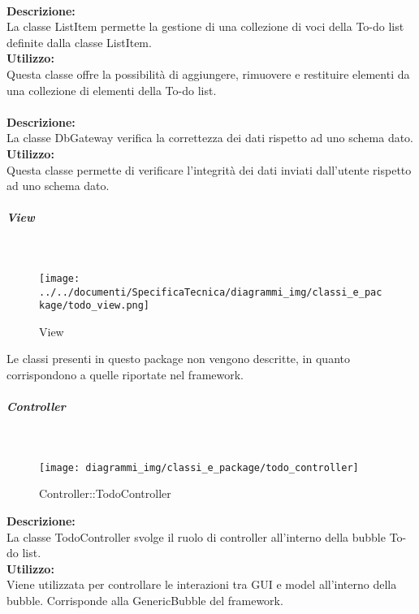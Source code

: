 \label{todo-container}\mbox{}\\
\textbf{Descrizione:}\\ \nopagebreak
La classe List\-Item permette la gestione di una collezione di voci della To-do list definite dalla classe List\-Item.\\
\textbf{Utilizzo:}\\ \nopagebreak
Questa classe offre la possibilità di aggiungere, rimuovere e restituire elementi da una collezione di elementi della To-do list.\\


\label{todo-gateway}\mbox{}\\
\textbf{Descrizione:}\\ \nopagebreak
La classe Db\-Gateway verifica la correttezza dei dati rispetto ad uno schema dato.
\textbf{Utilizzo:}\\ \nopagebreak
Questa classe permette di verificare l'integrità dei dati inviati dall'utente rispetto ad uno schema dato.

\begin{samepage}
	\subparagraph{View}\mbox{}\\
	\nopagebreak
	\begin{figure}[H]
		\centering
		\texttt{[image: ../../documenti/SpecificaTecnica/diagrammi\_img/classi\_e\_package/todo\_view.png]}
		\caption{View}
	\end{figure}
\end{samepage}
Le classi presenti in questo package non vengono descritte, in quanto corrispondono a quelle riportate nel framework.

\subparagraph{Controller}\mbox{}
\begin{samepage}
	\label{todo-controller}\mbox{}\\
	\nopagebreak
	\begin{figure}[H]
		\centering
		\texttt{[image: diagrammi\_img/classi\_e\_package/todo\_controller]}
		\caption{Controller\-::Todo\-Controller}
	\end{figure}
\end{samepage}
\textbf{Descrizione:}\\ \nopagebreak
La classe TodoController svolge il ruolo di controller all'interno della bubble To-do list. \\
\textbf{Utilizzo:}\\ \nopagebreak
Viene utilizzata per controllare le interazioni tra GUI e model all'interno della bubble. Corrisponde alla GenericBubble del framework. \\